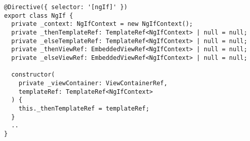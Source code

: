 \begin{verbatim}
@Directive({ selector: '[ngIf]' })
export class NgIf {
  private _context: NgIfContext = new NgIfContext();
  private _thenTemplateRef: TemplateRef<NgIfContext> | null = null;
  private _elseTemplateRef: TemplateRef<NgIfContext> | null = null;
  private _thenViewRef: EmbeddedViewRef<NgIfContext> | null = null;
  private _elseViewRef: EmbeddedViewRef<NgIfContext> | null = null;

  constructor(
    private _viewContainer: ViewContainerRef,
    templateRef: TemplateRef<NgIfContext>
  ) {
    this._thenTemplateRef = templateRef;
  }
  ..
}
\end{verbatim}
